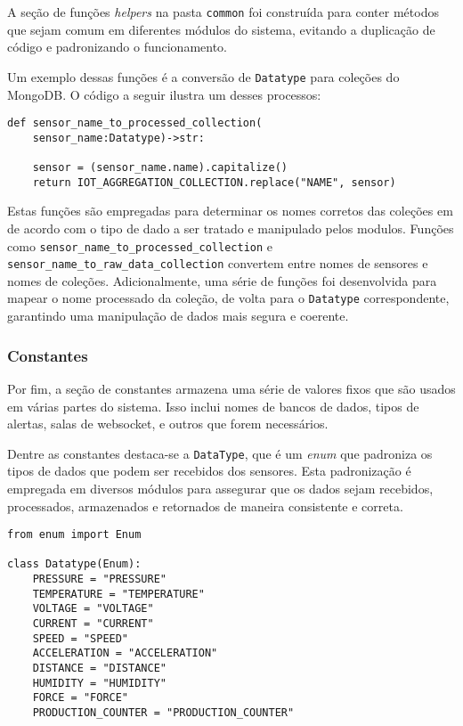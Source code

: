 A seção de funções \textit{helpers} na pasta \texttt{common} foi construída para conter métodos que sejam comum em diferentes módulos do sistema, evitando a duplicação de código e padronizando o funcionamento.

Um exemplo dessas funções é a conversão de \texttt{Datatype} para coleções do MongoDB. O código a seguir ilustra um desses processos:

\begin{verbatim}
def sensor_name_to_processed_collection(
    sensor_name:Datatype)->str:
    
    sensor = (sensor_name.name).capitalize()
    return IOT_AGGREGATION_COLLECTION.replace("NAME", sensor)

\end{verbatim}

Estas funções são empregadas para determinar os nomes corretos das coleções em de acordo com o tipo de dado a ser tratado e manipulado pelos modulos. Funções como \texttt{sensor\_name\_to\_processed\_collection} e \texttt{sensor\_name\_to\_raw\_data\_collection} convertem entre nomes de sensores e nomes de coleções. 
Adicionalmente, uma série de funções foi desenvolvida para mapear o nome processado da coleção, de volta para o \texttt{Datatype} correspondente, garantindo uma manipulação de dados mais segura e coerente.


\subsubsection{Constantes}
Por fim, a seção de constantes armazena uma série de valores fixos que são usados em várias partes do sistema. Isso inclui nomes de bancos de dados, tipos de alertas, salas de websocket, e outros que forem necessários.

Dentre as constantes destaca-se a \texttt{DataType}, que é um \textit{enum} que padroniza os tipos de dados que podem ser recebidos dos sensores. Esta padronização é empregada em diversos módulos para assegurar que os dados sejam recebidos, processados, armazenados e retornados de maneira consistente e correta.

\begin{verbatim}
from enum import Enum

class Datatype(Enum):
    PRESSURE = "PRESSURE"
    TEMPERATURE = "TEMPERATURE"
    VOLTAGE = "VOLTAGE"
    CURRENT = "CURRENT"
    SPEED = "SPEED"
    ACCELERATION = "ACCELERATION"
    DISTANCE = "DISTANCE"
    HUMIDITY = "HUMIDITY"
    FORCE = "FORCE"
    PRODUCTION_COUNTER = "PRODUCTION_COUNTER"
\end{verbatim}

